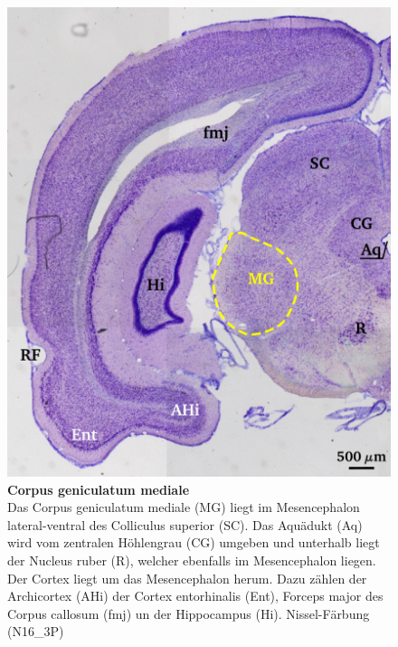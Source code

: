 \documentclass[12pt,a4paper,pdftex]{article}
\begin{document}
\begin{figure}[H]
    \centering
    \includegraphics{pictures/auditory/MG.png}
    \caption[Corpus geniculatum mediale]{\textbf{Corpus geniculatum mediale}\\
    Das Corpus geniculatum mediale (MG) liegt im Mesencephalon lateral-ventral des Colliculus superior (SC). Das Aquädukt (Aq) wird vom zentralen Höhlengrau (CG) umgeben und unterhalb liegt der Nucleus ruber (R), welcher ebenfalls im Mesencephalon liegen. Der Cortex liegt um das Mesencephalon herum. Dazu zählen der Archicortex (AHi) der Cortex entorhinalis (Ent), Forceps major des Corpus callosum (fmj) un der Hippocampus (Hi). Nissel-Färbung (N16\_3P)}
    \label{fig:MG}
\end{figure}
\end{document}
